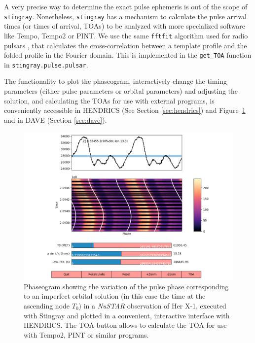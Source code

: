 \documentclass[twocolumn]{aastex62}
\newcommand{\project}[1]{\textsl{#1}\xspace}
\newcommand{\nustar}{\project{NuSTAR}\xspace}
\newcommand{\stingray}{\texttt{stingray}\xspace}
\begin{document}
A very precise way to determine the exact pulse ephemeris is out of the scope of \stingray. 
Nonetheless, \stingray has a mechanism to calculate the pulse arrival times (or times of arrival, TOAs) to be analyzed with more specialized software like Tempo, Tempo2 or PINT. 
We use the same \texttt{fftfit} algorithm used for radio pulsars \citep{Taylor92}, that calculates the cross-correlation between a template profile and the folded profile in the Fourier domain. 
This is implemented in the \texttt{get\_TOA} function in \texttt{stingray.pulse.pulsar}.

The functionality to plot the phaseogram, interactively change the timing parameters (either pulse parameters or orbital parameters) and adjusting the solution, and calculating the TOAs for use with external programs, is conveniently accessible in HENDRICS (See Section \ref{sec:hendrics}) and Figure~\ref{fig:phaseogram} and in DAVE (Section \ref{sec:dave}).

\begin{figure}[htbp]
\begin{center}
\includegraphics[width=\linewidth]{../figures/phaseogram.pdf}
\caption{Phaseogram showing the variation of the pulse phase corresponding to an imperfect orbital solution (in this case the time at the ascending node $T_0$) in a \nustar observation of Her X-1, executed with Stingray and plotted in a convenient, interactive interface with HENDRICS. 
The TOA button allows to calculate the TOA for use with Tempo2, PINT or similar programs.}
\label{fig:phaseogram}
\end{center}
\end{figure}
\end{document}
